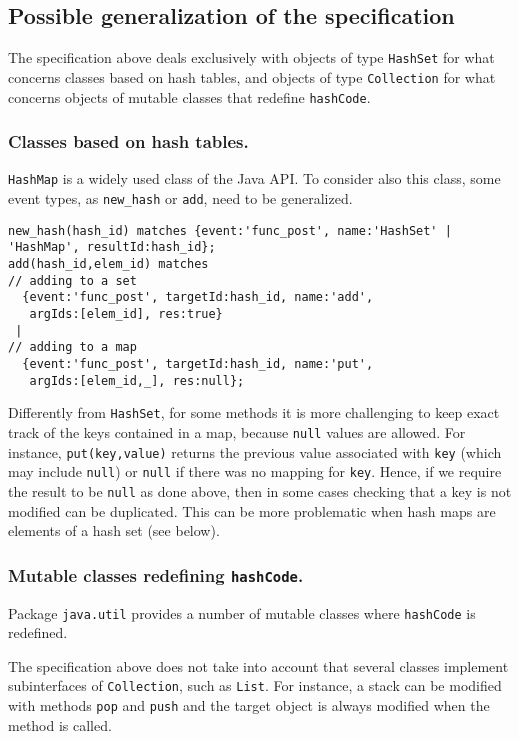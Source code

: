 \subsection*{Possible generalization of the specification}

The specification above deals exclusively with objects of type \lstinline{HashSet} for what concerns classes based on hash tables,
and objects of type \lstinline{Collection} for what concerns objects of mutable classes that redefine \lstinline{hashCode}. 

\subsubsection*{Classes based on hash tables.}
\lstinline{HashMap} is a widely used class of the Java API. To consider also this class,
some event types, as \lstinline{new_hash} or \lstinline{add}, need to be generalized. 
\begin{lstlisting}[basicstyle=\ttfamily\scriptsize]
new_hash(hash_id) matches {event:'func_post', name:'HashSet' | 'HashMap', resultId:hash_id};
add(hash_id,elem_id) matches
// adding to a set
  {event:'func_post', targetId:hash_id, name:'add',  
   argIds:[elem_id], res:true}
 |
// adding to a map  
  {event:'func_post', targetId:hash_id, name:'put',  
   argIds:[elem_id,_], res:null};
\end{lstlisting}
Differently from \lstinline{HashSet}, for some methods it is more challenging to keep exact track of the keys contained in a map, because \lstinline{null} values are allowed. For instance, \lstinline{put(key,value)} returns the previous value associated
with \lstinline{key} (which may include \lstinline{null}) or \lstinline{null} if there was no mapping for \lstinline{key}.
Hence, if we require the result to be \lstinline{null} as done above, then in some cases checking that a key is not modified can be duplicated.
This can be more problematic when hash maps are elements of a hash set (see below).

\subsubsection*{Mutable classes redefining \lstinline{hashCode}.} 
Package \lstinline{java.util} provides a number of mutable classes where \lstinline{hashCode} is redefined.

The specification above does not take into account that several classes implement subinterfaces of \lstinline{Collection}, such as \lstinline{List}.
For instance, a stack can be modified with methods \lstinline{pop} and \lstinline{push} and the target object is always modified when the method is called.

